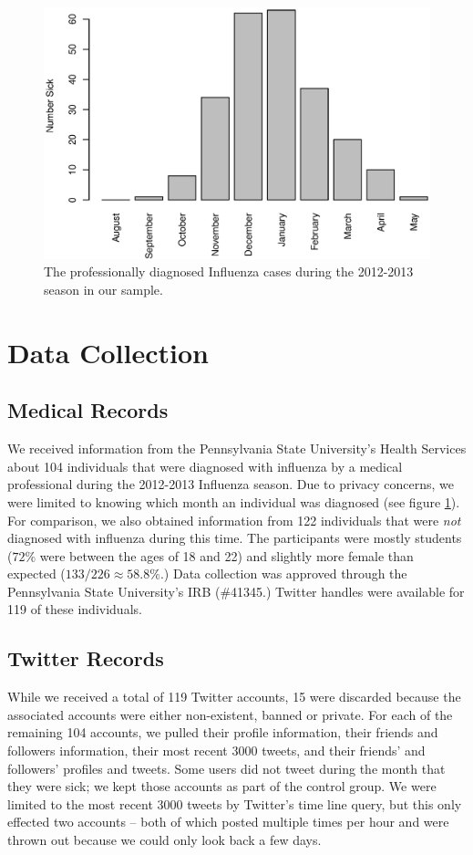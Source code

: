 \documentclass{acm_proc_article-sp}
\begin{document}
\begin{figure} [h]
\centering
\includegraphics[width=.45\textwidth]{figs/sick_count.eps}
\caption{The professionally diagnosed Influenza cases during the 2012-2013 season in our sample.}
\label{fig:flu_rate}
\end{figure}

\section{Data Collection}
\subsection{Medical Records}
We received information from the Pennsylvania State University's Health Services about 104 individuals that were diagnosed with influenza by a medical professional during the 2012-2013 Influenza season. Due to privacy concerns, we were limited to knowing which month an individual was diagnosed (see figure \ref{fig:flu_rate}).  For comparison, we also obtained information from 122 individuals that were \emph{not} diagnosed with influenza during this time. The participants were mostly students (\(72\%\) were between the ages of 18 and 22) and slightly more female than expected (\(133 / 226 \approx 58.8\%\).) Data collection was approved through the Pennsylvania State University's IRB (\#41345.) Twitter handles were available for 119 of these individuals.

\subsection{Twitter Records}
While we received a total of 119 Twitter accounts, 15 were discarded because the associated accounts were either non-existent, banned or private. For each of the remaining 104 accounts, we pulled their profile information, their friends and followers information, their most recent 3000 tweets, and their friends' and followers' profiles and tweets. Some users did not tweet during the month that they were sick; we kept those accounts as part of the control group. We were limited to the most recent 3000 tweets by Twitter's time line query, but this only effected two accounts -- both of which posted multiple times per hour and were thrown out because we could only look back a few days.
\end{document}
